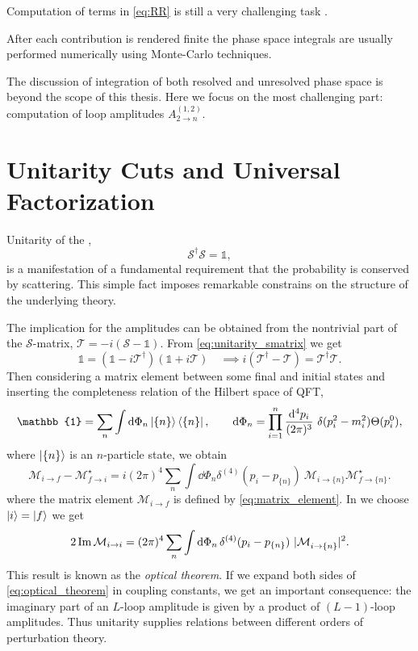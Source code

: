 Computation of terms in \eqref{eq:RR} is still a very challenging task .

After each contribution is rendered finite the phase space integrals are usually performed numerically using Monte-Carlo techniques.

The discussion of integration of both resolved and unresolved phase space is beyond the scope of this thesis.
Here we focus on the most challenging part:
computation of loop amplitudes $A^{(1,2)}_{2\to n}$.

\section{Unitarity Cuts and Universal Factorization}
\label{sec:unitarity}

Unitarity of the \sma{},
\begin{equation} \label{eq:unitarity_smatrix}
  \mathcal{S}^\dagger \mathcal{S} = \mathbb{1},
\end{equation}
is a manifestation of a
fundamental requirement that the probability is conserved by scattering.
This simple fact imposes remarkable constrains on the structure of the underlying theory.

The implication for the amplitudes can be obtained from the nontrivial part 
of the $\mathcal{S}$-matrix, $\mathcal{T} = -i(\mathcal{S}-\mathbb{1})$.
From \cref{eq:unitarity_smatrix} we get
\begin{equation}
  \mathbb{1} = (\mathbb{1}-i\mathcal{T}^\dagger)(\mathbb{1}+i\mathcal{T}) \quad\implies i(\mathcal{T}^\dagger- \mathcal{T}) = \mathcal{T}^\dagger\mathcal{T}.
\end{equation}
Then considering a matrix element between some final and initial states
and inserting the completeness relation of the Hilbert space of QFT,
\begin{equation}
  \mathbb{1} = \sum_n\int \dd{\Phi_n} \ket{\{n\}}\bra{\{n\}},    \qquad \dd{\Phi_n}=\prod_{i=1}^{n}\frac{\dd^4{p_i} }{(2\pi)^3} ~\delta(p_i^2-m_i^2) \Theta(p_i^{0}),
\end{equation}
where $\ket{\{n\}}$ is an $n$-particle state, we obtain
\begin{equation}
  \mathcal{M}_{i\to f} - \mathcal{M}_{f \to i}^\star = i (2\pi)^4 \sum_n \int \dd{\Phi_n} \delta^{(4)} (p_i - p_{\{n\}}) ~ \mathcal{M}_{i \to \{n\}}^{\phantom{\star}} \mathcal{M}^\star_{f \to \{n\}}.
\end{equation}
where the matrix element $\mathcal{M}_{i \to f}$ is defined by \cref{eq:matrix_element}. 
In we choose $\ket{i} = \ket{f}$ we get 
\begin{equation} \label{eq:optical_theorem}
  2 \Im\mathcal{M}_{i\to i} = (2\pi)^4 \sum_n \int \dd{\Phi_n} \delta^{(4)} (p_i - p_{\{n\}}) ~ \vert \mathcal{M}_{i \to \{n\}}^{\phantom{\star}} \vert^2.
\end{equation}
This result is known as the \emph{optical theorem}. 
If we expand both sides of \cref{eq:optical_theorem} in coupling constants, we get an important
consequence: the imaginary part of an $L$-loop amplitude is given by a product of $(L-1)$-loop amplitudes.
Thus unitarity supplies relations between different orders of perturbation theory.

